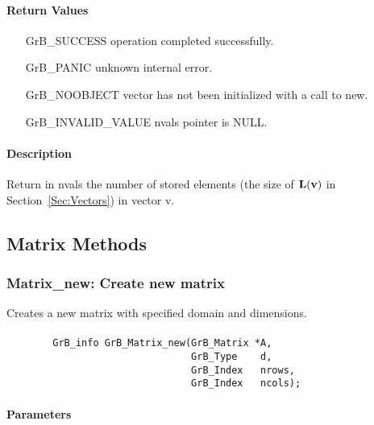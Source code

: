 \paragraph{Return Values}

\begin{itemize}[leftmargin=2.1in]
\item[{\sf GrB\_SUCCESS}]   operation completed successfully.
\item[{\sf GrB\_PANIC}]     unknown internal error.
\item[{\sf GrB\_NOOBJECT}]  vector has not been initialized with a call to {\sf new}.
\item[{\sf GrB\_INVALID\_VALUE}]    {\sf nvals} pointer is {\sf NULL}.
\end{itemize}

\paragraph{Description}

Return in {\sf nvals} the number of stored elements (the size of $\bold{L}({\bf v})$
in Section~\ref{Sec:Vectors}) in vector {\sf v}.


\subsection{Matrix Methods}

\subsubsection{{\sf Matrix\_new}: Create new matrix}

Creates a new matrix with specified domain and dimensions.

\paragraph{\syntax}

\begin{verbatim}
        GrB_info GrB_Matrix_new(GrB_Matrix *A,
                                GrB_Type    d,
                                GrB_Index   nrows,
                                GrB_Index   ncols);
\end{verbatim}

\paragraph{Parameters}

